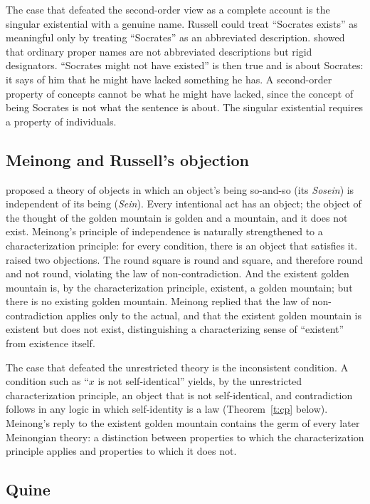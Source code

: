 \documentclass{situationist-preprint}
\begin{document}
The case that defeated the second-order view as a complete account is the singular existential with a genuine name. Russell could treat \enquote{Socrates exists} as meaningful only by treating \enquote{Socrates} as an abbreviated description. \citet{Kripke1980} showed that ordinary proper names are not abbreviated descriptions but rigid designators. \enquote{Socrates might not have existed} is then true and is about Socrates: it says of him that he might have lacked something he has. A second-order property of concepts cannot be what he might have lacked, since the concept of being Socrates is not what the sentence is about. The singular existential requires a property of individuals.

\subsection{Meinong and Russell's objection}

\citet{Meinong1904} proposed a theory of objects in which an object's being so-and-so (its \emph{Sosein}) is independent of its being (\emph{Sein}). Every intentional act has an object; the object of the thought of the golden mountain is golden and a mountain, and it does not exist. Meinong's principle of independence is naturally strengthened to a characterization principle: for every condition, there is an object that satisfies it. \citet{Russell1905} raised two objections. The round square is round and square, and therefore round and not round, violating the law of non-contradiction. And the existent golden mountain is, by the characterization principle, existent, a golden mountain; but there is no existing golden mountain. Meinong replied that the law of non-contradiction applies only to the actual, and that the existent golden mountain is existent but does not exist, distinguishing a characterizing sense of \enquote{existent} from existence itself.

The case that defeated the unrestricted theory is the inconsistent condition. A condition such as \enquote{$x$ is not self-identical} yields, by the unrestricted characterization principle, an object that is not self-identical, and contradiction follows in any logic in which self-identity is a law (Theorem~\ref{t:cp} below). Meinong's reply to the existent golden mountain contains the germ of every later Meinongian theory: a distinction between properties to which the characterization principle applies and properties to which it does not.

\subsection{Quine}
\end{document}
